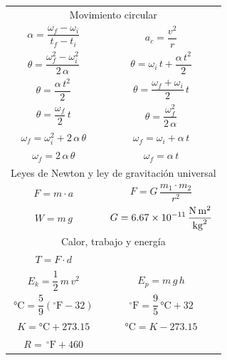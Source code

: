 \documentclass[12pt, letter]{exam}
\begin{document}
\begin{table}[H]
    \centering
    \setlength{\tabcolsep}{40pt}
    \renewcommand{\arraystretch}{2.5}
    \begin{tabular}{c  c}
        \multicolumn{2}{c}{Movimiento circular} \\
            $\alpha = \dfrac{\omega_{f} - \omega_{i}}{t_{f} - t_{i}}$ & $a_{c} = \dfrac{v^{2}}{r}$ \\
            $\theta = \dfrac{\omega_{f}^{2} - \omega_{i}^{2}}{2 \, \alpha}$ & $\theta = \omega_{i} \, t + \dfrac{\alpha \, t^{2}}{2}$ \\
            $\theta = \dfrac{\alpha \, t^{2}}{2}$ & $\theta = \dfrac{\omega_{f} + \omega_{i}}{2} \, t$ \\
            $\theta = \dfrac{\omega_{f}}{2} \, t$ & $\theta = \dfrac{\omega_{f}^{2}}{2 \, \alpha}$ \\
            $\omega_{f} = \omega_{i}^{2} + 2 \, \alpha \, \theta$ & $\omega_{f} = \omega_{i} + \alpha \, t$ \\
            $\omega_{f} = 2 \, \alpha \, \theta$ & $\omega_{f} = \alpha \, t$ \\ \hline
        \multicolumn{2}{c}{Leyes de Newton y ley de gravitación universal} \\
            $F = m \cdot a$ & $F = G \, \dfrac{m_{1} \cdot m_{2}}{r^{2}}$ \\
            $W = m \, g$ & $G = \displaystyle \SI[per-mode=fraction]{6.67d-11}{\newton\square\meter\per\square\kilo\gram}$ \\ \hline
        \multicolumn{2}{c}{Calor, trabajo y energía} \\
            $T = F \cdot d$ &  \\
            $E_{k} = \dfrac{1}{2} \, m \, v^{2}$ & $E_{p} = m \, g \, h$ \\
            $\unit{\degreeCelsius} = \dfrac{5}{9} \left( ^{\circ}\text{F} - 32 \right)$ & $^{\circ}\text{F} = \dfrac{9}{5} \, \unit{\degreeCelsius} + 32$ \\
            $K = \unit{\degreeCelsius} + 273.15$ & $\unit{\degreeCelsius} = K - 273.15$ \\
            $R = \, ^{\circ}\text{F} + 460$ &  \\ \hline
\end{tabular}
\end{table}
\end{document}
